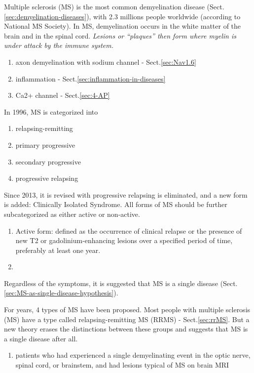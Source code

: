 Multiple sclerosis (MS) is the most common demyelination disease
(Sect.\ref{sec:demyelination-diseases}), with 2.3 millions people worldwide
(according to National MS Society). In MS, demyelination occurs in the white
matter of the brain and in the spinal cord. 
{\it Lesions or “plaques” then form where myelin is under attack by the immune system.}

\begin{enumerate}
  \item axon demyelination with sodium channel - Sect.\ref{sec:Nav1.6}
  
  \item inflammation - Sect.\ref{sec:inflammation-in-diseases}
  
  \item Ca2+ channel - Sect.\ref{sec:4-AP}
\end{enumerate}

In 1996, MS is categorized into 
\begin{enumerate}
  \item relapsing-remitting 
  \item primary progressive
  \item secondary progressive
  \item progressive relapsing
\end{enumerate}
Since 2013, it is revised with progressive relapsing is eliminated, and a new form is added: Clinically Isolated Syndrome.
All forms of MS should be further subcategorized as either active or non-active.
\begin{enumerate}
  
  \item Active form:  defined as the occurrence of clinical relapse or the
  presence of new T2 or gadolinium-enhancing lesions over a specified period of
  time, preferably at least one year.
  
  \item 
\end{enumerate}
Regardless of the symptoms, it is suggested that MS is a single disease (Sect.\ref{sec:MS-as-single-disease-hypothesis}).

For years, 4 types of MS have been proposed. Most people with multiple sclerosis
(MS) have a type called relapsing-remitting MS (RRMS) - Sect.\ref{sec:rrMS}.
But a new theory erases the distinctions between these groups and suggests that
MS is a single disease after all.

\begin{enumerate}
  
  \item 
  
   patients who had experienced a single demyelinating event in the optic nerve,
   spinal cord, or brainstem, and had lesions typical of MS on brain MRI
   
   
\end{enumerate}


